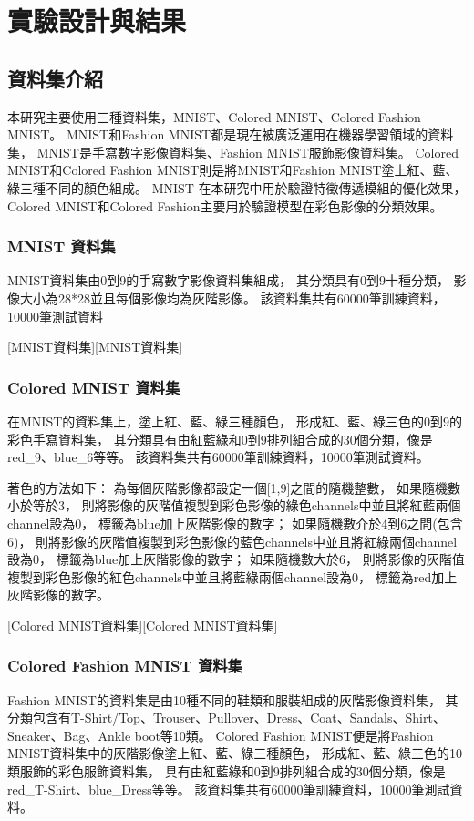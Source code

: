 \documentclass[class=NCU\_thesis, crop=false]{standalone}
\begin{document}
\chapter{實驗設計與結果}
\section{資料集介紹}
本研究主要使用三種資料集，MNIST、Colored MNIST、Colored Fashion MNIST。
MNIST和Fashion MNIST都是現在被廣泛運用在機器學習領域的資料集，
MNIST是手寫數字影像資料集、Fashion MNIST服飾影像資料集。 
Colored MNIST和Colored Fashion MNIST則是將MNIST和Fashion MNIST塗上紅、藍、綠三種不同的顏色組成。
MNIST 在本研究中用於驗證特徵傳遞模組的優化效果，
Colored MNIST和Colored Fashion主要用於驗證模型在彩色影像的分類效果。
\pagebreak
    \subsection{MNIST 資料集}
    MNIST資料集由0到9的手寫數字影像資料集組成，
    其分類具有0到9十種分類，
    影像大小為28*28並且每個影像均為灰階影像。
    該資料集共有60000筆訓練資料，10000筆測試資料

    [MNIST資料集][MNIST資料集]
    \pagebreak
    \subsection{Colored MNIST 資料集}
    在MNIST的資料集上，塗上紅、藍、綠三種顏色，
    形成紅、藍、綠三色的0到9的彩色手寫資料集，
    其分類具有由紅藍綠和0到9排列組合成的30個分類，像是red\_9、blue\_6等等。
    該資料集共有60000筆訓練資料，10000筆測試資料。

    著色的方法如下：
    為每個灰階影像都設定一個[1,9]之間的隨機整數，
    如果隨機數小於等於3，
    則將影像的灰階值複製到彩色影像的綠色channels中並且將紅藍兩個channel設為0，
    標籤為blue加上灰階影像的數字；
    如果隨機數介於4到6之間(包含6)，
    則將影像的灰階值複製到彩色影像的藍色channels中並且將紅綠兩個channel設為0，
    標籤為blue加上灰階影像的數字；
    如果隨機數大於6，
    則將影像的灰階值複製到彩色影像的紅色channels中並且將藍綠兩個channel設為0，
    標籤為red加上灰階影像的數字。

    [Colored MNIST資料集][Colored MNIST資料集]
    \pagebreak
    \subsection{Colored Fashion MNIST 資料集}
    Fashion MNIST的資料集是由10種不同的鞋類和服裝組成的灰階影像資料集，
    其分類包含有T-Shirt/Top、Trouser、Pullover、Dress、Coat、Sandals、Shirt、Sneaker、Bag、Ankle boot等10類。
    Colored Fashion MNIST便是將Fashion MNIST資料集中的灰階影像塗上紅、藍、綠三種顏色，
    形成紅、藍、綠三色的10類服飾的彩色服飾資料集，
    具有由紅藍綠和0到9排列組合成的30個分類，像是red\_T-Shirt、blue\_Dress等等。
    該資料集共有60000筆訓練資料，10000筆測試資料。
\end{document}
